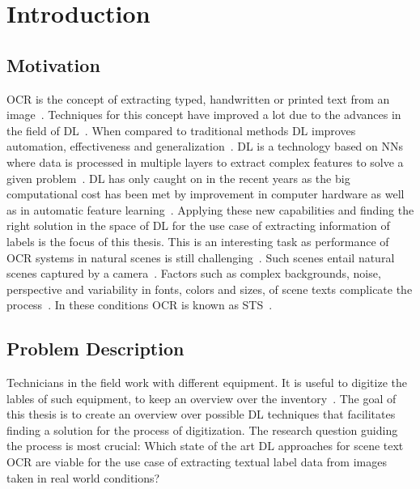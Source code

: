 \chapter{Introduction}\label{ch:intro}
\section{Motivation}
\ac{OCR} is the concept of extracting typed, handwritten or printed text
from an image~\citep{zhao_improving_2020}.
Techniques for this concept have improved a lot due to the advances in the field of
\ac{DL}~\citep{zhao_improving_2020}.
When compared to traditional methods \ac{DL} improves automation, effectiveness and
generalization~\citep{chen_text_2021}.
\ac{DL} is a technology based on \acp{NN} where data is processed
in multiple layers to extract complex features to solve a given problem~\citep{shrestha_review_2019}.
\ac{DL} has only caught on in the recent years as the big computational cost has been met
by improvement in computer hardware as well as in automatic feature
learning~\citep{ponti_everything_2017, chen_text_2021}.
Applying these new capabilities and finding the right solution in the space of \ac{DL} for the
use case of extracting information of labels is the focus of this thesis.
This is an interesting task as performance of \ac{OCR} systems in natural scenes is still
challenging~\citep{zhao_improving_2020, chen_text_2021}.
Such scenes entail natural scenes captured by a camera~\citep{chen_text_2021, baek_what_2019}.
Factors such as complex backgrounds, noise, perspective and variability in fonts, colors and sizes,
of scene texts complicate the process~\citep{hu_gtc_2020,chen_text_2021,baek_what_2019}.
In these conditions \ac{OCR} is known as \ac{STS}~\citep{long_scene_2021}.

\section{Problem Description}\label{se:problem}
Technicians in the field work with different equipment.
It is useful to digitize the lables of such equipment, to keep an overview over the
inventory~\citep{abramowicz_business_2019}.
The goal of this thesis is to create an overview over possible \ac{DL} techniques that facilitates
finding a solution for the process of digitization.
The research question guiding the process is most crucial:
Which state of the art \ac{DL} approaches for scene text \ac{OCR} are viable for the use case of
extracting textual label data from images taken in real world conditions?

